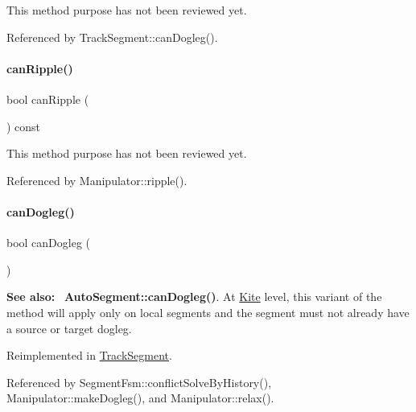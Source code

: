 This method purpose has not been reviewed yet. 

Referenced by Track\+Segment\+::can\+Dogleg().

\mbox{\label{classKite_1_1TrackElement_a9b37c425c3152c576444ac0253b04f9f}} 
\paragraph{\texorpdfstring{can\+Ripple()}{canRipple()}}
{\footnotesize\ttfamily bool can\+Ripple (\begin{DoxyParamCaption}{ }\end{DoxyParamCaption}) const\hspace{0.3cm}{\ttfamily [inline]}}

This method purpose has not been reviewed yet. 

Referenced by Manipulator\+::ripple().

\mbox{\label{classKite_1_1TrackElement_aa0bb6f1592688e942ff67e0ac318a4fd}} 
\paragraph{\texorpdfstring{can\+Dogleg()}{canDogleg()}\hspace{0.1cm}{\footnotesize\ttfamily [1/3]}}
{\footnotesize\ttfamily bool can\+Dogleg (\begin{DoxyParamCaption}{ }\end{DoxyParamCaption})\hspace{0.3cm}{\ttfamily [virtual]}}

{\bfseries See also\+:}~ \textbf{ Auto\+Segment\+::can\+Dogleg()}. At \mbox{\hyperlink{namespaceKite}{Kite}} level, this variant of the method will apply only on local segments and the segment must not already have a source or target dogleg. 

Reimplemented in \mbox{\hyperlink{classKite_1_1TrackSegment_aa0bb6f1592688e942ff67e0ac318a4fd}{Track\+Segment}}.



Referenced by Segment\+Fsm\+::conflict\+Solve\+By\+History(), Manipulator\+::make\+Dogleg(), and Manipulator\+::relax().

